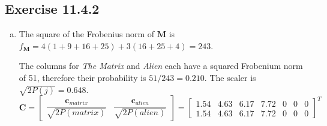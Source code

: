 \documentclass[11pt]{article}
\newcommand{\bM}{ \bm{M} }
\newcommand{\bC}{ \bm{C} }
\newcommand{\bc}{ \bm{c} }
\begin{document}
\subsection*{Exercise 11.4.2}
\begin{enumerate}[(a)]
\item The square of the Frobenius norm of $\bM$ is $f_{\bM} = 4(1 + 9 + 16 + 25)
  + 3 (16 + 25 + 4) = 243$.

  The columns for \textit{The Matrix} and \textit{Alien} each have a squared
  Frobenium norm of 51, therefore their probability is $51/243 = 0.210$. The scaler is $\sqrt{2P(j)} = 0.648$.
  \[
    \bC =
    \begin{bmatrix}
      \dfrac{\bc_{\mathit{matrix}}}{\sqrt{2P(\mathit{matrix})}}
      & \dfrac{\bc_{\mathit{alien}}}{\sqrt{2P(\mathit{alien})}}
    \end{bmatrix}
    =
    \begin{bmatrix}
      1.54 & 4.63 & 6.17 & 7.72 & 0 & 0 & 0 \\
      1.54 & 4.63 & 6.17 & 7.72 & 0 & 0 & 0
    \end{bmatrix}^T
  \]


\end{enumerate}
\end{document}
